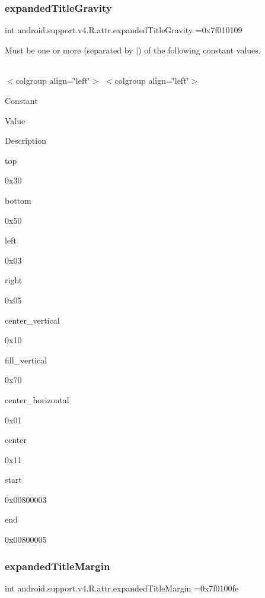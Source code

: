 \subsubsection{\texorpdfstring{expanded\+Title\+Gravity}{expandedTitleGravity}}
{\footnotesize\ttfamily int android.\+support.\+v4.\+R.\+attr.\+expanded\+Title\+Gravity =0x7f010109\hspace{0.3cm}{\ttfamily [static]}}

Must be one or more (separated by \textquotesingle{}$\vert$\textquotesingle{}) of the following constant values.

\tabulinesep=1mm
\begin{longtabu} spread 0pt [c]{*{0}{|X[-1]}|}
\hline
\end{longtabu}
$<$colgroup align=\char`\"{}left\char`\"{}$>$ $<$colgroup align=\char`\"{}left\char`\"{}$>$ 

Constant

Value

Description 

{\ttfamily top}

0x30

{\ttfamily bottom}

0x50

{\ttfamily left}

0x03

{\ttfamily right}

0x05

{\ttfamily center\+\_\+vertical}

0x10

{\ttfamily fill\+\_\+vertical}

0x70

{\ttfamily center\+\_\+horizontal}

0x01

{\ttfamily center}

0x11

{\ttfamily start}

0x00800003

{\ttfamily end}

0x00800005\mbox{\label{classandroid_1_1support_1_1v4_1_1R_1_1attr_a4253f12931205653e5fd1755c2755fc5}} 
\subsubsection{\texorpdfstring{expanded\+Title\+Margin}{expandedTitleMargin}}
{\footnotesize\ttfamily int android.\+support.\+v4.\+R.\+attr.\+expanded\+Title\+Margin =0x7f0100fe\hspace{0.3cm}{\ttfamily [static]}}

